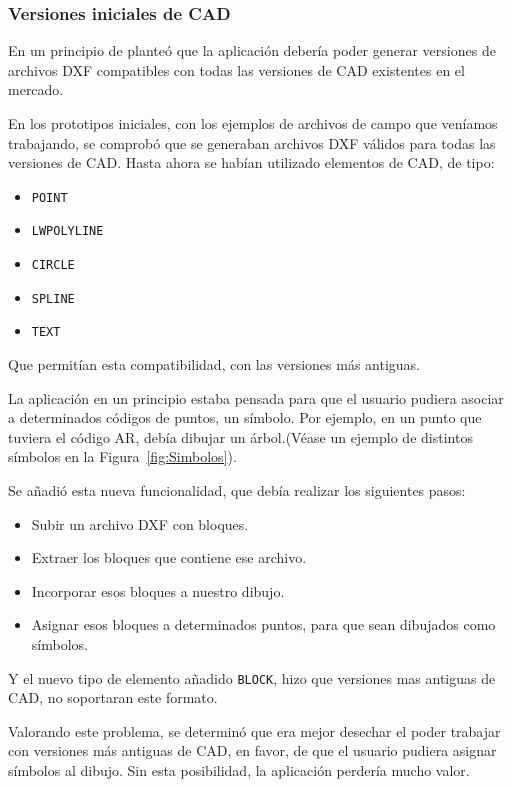 \subsubsection{Versiones iniciales de CAD}

En un principio de planteó que la aplicación debería poder generar versiones de archivos DXF compatibles con todas las versiones de CAD existentes en el mercado.

En los prototipos iniciales, con los ejemplos de archivos de campo que veníamos trabajando, se comprobó que se generaban archivos DXF válidos para todas las versiones de CAD. Hasta ahora se habían utilizado elementos de CAD, de tipo:

\begin{itemize}
\item \texttt{POINT}
\item \texttt{LWPOLYLINE}
\item \texttt{CIRCLE}
\item \texttt{SPLINE}
\item \texttt{TEXT}
\end{itemize}

Que permitían esta compatibilidad, con las versiones más antiguas.   

La aplicación en un principio estaba pensada para que el usuario pudiera asociar   a determinados códigos de puntos, un símbolo. Por ejemplo, en un punto que tuviera el código AR, debía dibujar un árbol.(Véase un ejemplo de distintos símbolos en la Figura~\ref{fig:Simbolos}).

Se añadió esta nueva funcionalidad, que debía realizar los siguientes pasos:

\begin{itemize}
\item Subir un archivo DXF con bloques.
\item Extraer los bloques que contiene ese archivo.
\item Incorporar esos bloques a nuestro dibujo.
\item Asignar esos bloques a determinados puntos, para que sean dibujados como símbolos.
\end{itemize}

Y el nuevo tipo de elemento añadido \texttt{BLOCK}, hizo que versiones mas antiguas de CAD, no soportaran este formato.

Valorando este problema, se determinó que era mejor desechar el poder trabajar con versiones más antiguas de CAD, en favor, de que el usuario pudiera asignar símbolos al dibujo. Sin esta posibilidad, la aplicación perdería mucho valor.


